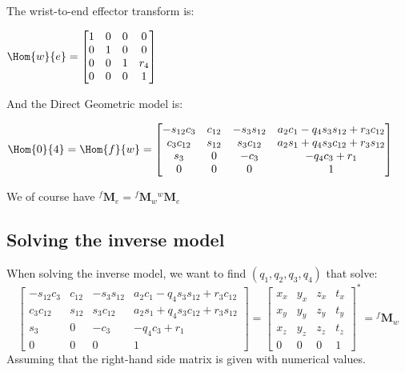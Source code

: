\documentclass{ecnreport}
\begin{document}
The wrist-to-end effector transform is:
\begin{center}
$\Hom{w}{e} = \left[\begin{matrix}1 & 0 & 0 & 0\\
0 & 1 & 0 & 0\\0 & 0 & 1 & r_4\\0 & 0 & 0 & 1\end{matrix}\right]$
\end{center}

And the Direct Geometric model is:
\begin{center}
$\Hom{0}{4} = \Hom{f}{w} = \left[\begin{matrix}- s_{12} c_3 & c_{12} & - s_3 s_{12} & a_{2} c_1 - q_{4} s_3 s_{12} + r_{3} c_{12}\\c_3 c_{12} & s_{12} & s_3 c_{12} & a_{2} s_1 + q_{4} s_3 c_{12} + r_{3} s_{12}\\s_3 & 0 & - c_3 & - q_{4} c_3 + r_{1}\\0 & 0 & 0 & 1\end{matrix}\right]$
    \end{center}
    We of course have ${}^f\mathbf{M}_e = {}^f\mathbf{M}_w{}^w\mathbf{M}_e$

\subsection*{Solving the inverse model}

When solving the inverse model, we want to find $(q_1, q_2, q_3, q_4)$ that solve:\\
\begin{equation} \left[\begin{matrix}- s_{12} c_3 & c_{12} & - s_3 s_{12} & a_{2} c_1 - q_{4} s_3 s_{12} + r_{3} c_{12}\\c_3 c_{12} & s_{12} & s_3 c_{12} & a_{2} s_1 + q_{4} s_3 c_{12} + r_{3} s_{12}\\s_3 & 0 & - c_3 & - q_{4} c_3 + r_{1}\\0 & 0 & 0 & 1\end{matrix}\right] = \left[\begin{matrix}x_x & y_x & z_x & t_x\\x_y & y_y & z_y & t_y\\x_z & y_z & z_z & t_z\\0 & 0 & 0 & 1\end{matrix}\right]^* = {}^f\mathbf{M}_w
\label{model}
\end{equation}
Assuming that the right-hand side matrix is given with numerical values.
\end{document}

